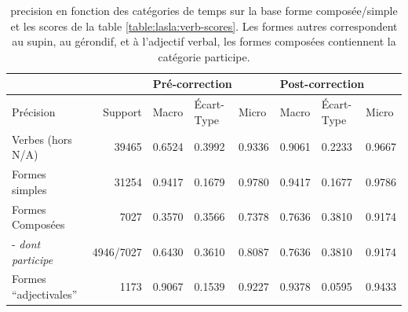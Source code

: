 
\begin{table}[h]
\centering
\begin{tabular}{@{}l|r|lll|lll@{}}
\toprule
                                &         & \multicolumn{3}{l}{Pré-correction} & \multicolumn{3}{l}{Post-correction} \\ \midrule
Précision                       & Support & Macro    & Écart-Type   & Micro    & Macro     & Écart-Type   & Micro    \\ \midrule
Verbes (hors N/A)               & 39465   & 0.6524   & 0.3992       & 0.9336   & 0.9061    & 0.2233       & 0.9667   \\
Formes simples                  & 31254   & 0.9417   & 0.1679       & 0.9780   & 0.9417    & 0.1677       & 0.9786   \\
Formes Composées                & 7027    & 0.3570   & 0.3566       & 0.7378   & 0.7636    & 0.3810       & 0.9174   \\
- \textit{dont participe}       & 4946/7027    & 0.6430   & 0.3610       & 0.8087   & 0.7636    & 0.3810       & 0.9174   \\
Formes “adjectivales”           & 1173    & 0.9067   & 0.1539       & 0.9227   & 0.9378    & 0.0595       & 0.9433   \\ \bottomrule
\end{tabular}
\caption{\Gls{precision} en fonction des catégories de temps sur la base forme composée/simple et les scores de la table \ref{table:lasla:verb-scores}. Les formes autres correspondent au supin, au gérondif, et à l'adjectif verbal, les formes composées contiennent la catégorie participe.}
\label{table:lasla:formes-simples-formes-composees}
\end{table}



